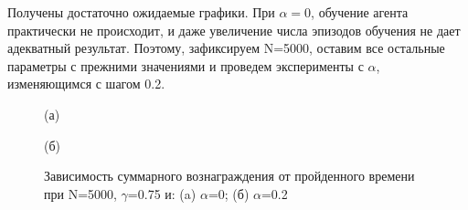 \documentclass[a4paper]{report}
\theoremstyle{definition}
\theoremstyle{plain}
\theoremstyle{remark}
\theoremstyle{remark}
\theoremstyle{definition}
\begin{document}
Получены достаточно ожидаемые графики. При $\alpha=0$, обучение агента практически не происходит, и даже увеличение числа эпизодов обучения не дает адекватный результат. Поэтому, зафиксируем N=5000, оставим все остальные параметры с прежними значениями и проведем эксперименты с $\alpha$, изменяющимся с шагом 0.2.

\begin{figure}[H]
    \begin{minipage}[H]{0.49\linewidth}
        (а)\\
    \end{minipage}
    \hfill
    \begin{minipage}[H]{0.49\linewidth}
        (б)\\
    \end{minipage}
      \caption{Зависимость суммарного вознаграждения от пройденного времени при N=5000, $\gamma$=0.75 и: (a) $\alpha$=0; (б) $\alpha$=0.2}
\end{figure}
\end{document}
